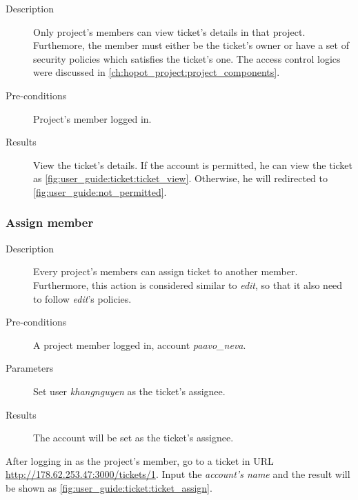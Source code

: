\begin{description}
\item[Description] Only project's members can view ticket's details in that project.
Furthemore, the member must either be the ticket's owner or have a set of security policies which satisfies the ticket's one.
The access control logics were discussed in \autoref{ch:hopot_project:project_components}.
\item[Pre-conditions] Project's member logged in.
\item[Results] View the ticket's details.
If the account is permitted, he can view the ticket as \autoref{fig:user_guide:ticket:ticket_view}.
Otherwise, he will redirected to \autoref{fig:user_guide:not_permitted}.
\end{description}

\subsubsection{Assign member}
\label{ch:appendix-a:user_guide:ticket:managing_member}

\begin{description}
\item[Description] Every project's members can assign ticket to another member.
Furthermore, this action is considered similar to \emph{edit}, so that it also need to follow \emph{edit}'s policies.
\item[Pre-conditions] A project member logged in, \eg account \emph{paavo\_neva}.
\item[Parameters] Set user \emph{khangnguyen} as the ticket's assignee.
\item[Results] The account will be set as the ticket's assignee.
\end{description}

After logging in as the project's member, go to a ticket in URL \href{http://178.62.253.47:3000/tickets/1}{http://178.62.253.47:3000/tickets/1}.
Input the \emph{account's name} and the result will be shown as \autoref{fig:user_guide:ticket:ticket_assign}.

